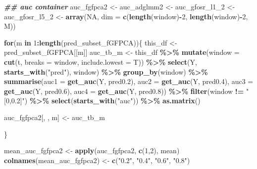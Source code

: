 \documentclass[
]{article}
\newenvironment{Shaded}{\begin{snugshade}}{\end{snugshade}}
\newcommand{\AttributeTok}[1]{\textcolor[rgb]{0.13,0.29,0.53}{#1}}
\newcommand{\ConstantTok}[1]{\textcolor[rgb]{0.56,0.35,0.01}{#1}}
\newcommand{\ControlFlowTok}[1]{\textcolor[rgb]{0.13,0.29,0.53}{\textbf{#1}}}
\newcommand{\DecValTok}[1]{\textcolor[rgb]{0.00,0.00,0.81}{#1}}
\newcommand{\DocumentationTok}[1]{\textcolor[rgb]{0.56,0.35,0.01}{\textbf{\textit{#1}}}}
\newcommand{\FloatTok}[1]{\textcolor[rgb]{0.00,0.00,0.81}{#1}}
\newcommand{\FunctionTok}[1]{\textcolor[rgb]{0.13,0.29,0.53}{\textbf{#1}}}
\newcommand{\NormalTok}[1]{#1}
\newcommand{\OtherTok}[1]{\textcolor[rgb]{0.56,0.35,0.01}{#1}}
\newcommand{\SpecialCharTok}[1]{\textcolor[rgb]{0.81,0.36,0.00}{\textbf{#1}}}
\newcommand{\StringTok}[1]{\textcolor[rgb]{0.31,0.60,0.02}{#1}}
\begin{document}
\begin{Shaded}
\begin{Highlighting}[]
\DocumentationTok{\#\# auc container }
\NormalTok{auc\_fgfpca2 }\OtherTok{\textless{}{-}}\NormalTok{ auc\_adglmm2 }\OtherTok{\textless{}{-}}\NormalTok{ auc\_gfosr\_l1\_2 }\OtherTok{\textless{}{-}}\NormalTok{ auc\_gfosr\_l5\_2 }\OtherTok{\textless{}{-}} 
  \FunctionTok{array}\NormalTok{(}\ConstantTok{NA}\NormalTok{, }\AttributeTok{dim =} \FunctionTok{c}\NormalTok{(}\FunctionTok{length}\NormalTok{(window)}\SpecialCharTok{{-}}\DecValTok{2}\NormalTok{, }\FunctionTok{length}\NormalTok{(window)}\SpecialCharTok{{-}}\DecValTok{2}\NormalTok{, M))}
\end{Highlighting}
\end{Shaded}

\begin{Shaded}
\begin{Highlighting}[]
\ControlFlowTok{for}\NormalTok{(m }\ControlFlowTok{in} \DecValTok{1}\SpecialCharTok{:}\FunctionTok{length}\NormalTok{(pred\_subset\_fGFPCA))\{}
\NormalTok{  this\_df }\OtherTok{\textless{}{-}}\NormalTok{ pred\_subset\_fGFPCA[[m]]}
\NormalTok{  auc\_tb\_m }\OtherTok{\textless{}{-}}\NormalTok{ this\_df }\SpecialCharTok{\%\textgreater{}\%}
  \FunctionTok{mutate}\NormalTok{(}\AttributeTok{window =} \FunctionTok{cut}\NormalTok{(t, }\AttributeTok{breaks =}\NormalTok{ window, }\AttributeTok{include.lowest =}\NormalTok{ T)) }\SpecialCharTok{\%\textgreater{}\%} 
  \FunctionTok{select}\NormalTok{(Y, }\FunctionTok{starts\_with}\NormalTok{(}\StringTok{"pred"}\NormalTok{), window) }\SpecialCharTok{\%\textgreater{}\%}
  \FunctionTok{group\_by}\NormalTok{(window) }\SpecialCharTok{\%\textgreater{}\%}
  \FunctionTok{summarise}\NormalTok{(}\AttributeTok{auc1 =} \FunctionTok{get\_auc}\NormalTok{(Y, pred0}\FloatTok{.2}\NormalTok{),}
            \AttributeTok{auc2 =} \FunctionTok{get\_auc}\NormalTok{(Y, pred0}\FloatTok{.4}\NormalTok{),}
            \AttributeTok{auc3 =} \FunctionTok{get\_auc}\NormalTok{(Y, pred0}\FloatTok{.6}\NormalTok{),}
            \AttributeTok{auc4 =} \FunctionTok{get\_auc}\NormalTok{(Y, pred0}\FloatTok{.8}\NormalTok{)) }\SpecialCharTok{\%\textgreater{}\%}
  \FunctionTok{filter}\NormalTok{(window }\SpecialCharTok{!=} \StringTok{"[0,0.2]"}\NormalTok{) }\SpecialCharTok{\%\textgreater{}\%} 
  \FunctionTok{select}\NormalTok{(}\FunctionTok{starts\_with}\NormalTok{(}\StringTok{"auc"}\NormalTok{)) }\SpecialCharTok{\%\textgreater{}\%} \FunctionTok{as.matrix}\NormalTok{()}
  
\NormalTok{  auc\_fgfpca2[, , m] }\OtherTok{\textless{}{-}}\NormalTok{ auc\_tb\_m}
  
\NormalTok{\}}

\NormalTok{mean\_auc\_fgfpca2 }\OtherTok{\textless{}{-}} \FunctionTok{apply}\NormalTok{(auc\_fgfpca2, }\FunctionTok{c}\NormalTok{(}\DecValTok{1}\NormalTok{,}\DecValTok{2}\NormalTok{), mean)}
\FunctionTok{colnames}\NormalTok{(mean\_auc\_fgfpca2) }\OtherTok{\textless{}{-}} \FunctionTok{c}\NormalTok{(}\StringTok{"0.2"}\NormalTok{, }\StringTok{"0.4"}\NormalTok{, }\StringTok{"0.6"}\NormalTok{, }\StringTok{"0.8"}\NormalTok{)}
\end{Highlighting}
\end{Shaded}
\end{document}

